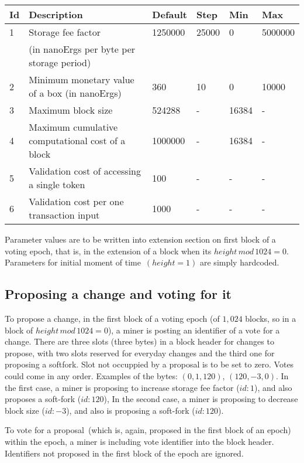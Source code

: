 \begin{tabular}{| l | l | l | l | l | l |}
\hline
Id & Description & Default & Step & Min & Max \\
\hline
\hline
1 & Storage fee factor  & 1250000 & 25000 & 0 & 5000000 \\
  &  (in nanoErgs per byte per storage period) & & & & \\
\hline
2 & Minimum monetary value of a box (in nanoErgs) & 360 & 10 & 0 & 10000 \\
\hline
3 & Maximum block size & 524288 & - & 16384 & - \\
\hline
4 & Maximum cumulative computational cost of a block & 1000000 & - & 16384 & - \\
\hline
5 & Validation cost of accessing a single token & 100 & - & - & - \\
\hline
6 & Validation cost per one transaction input & 1000 & - & - & - \\
\hline
\end{tabular}

Parameter values are to be written into extension section on first block of a voting epoch,
that is, in the extension of a block when its $height\,mod\,1024 = 0$.
Parameters for initial moment of time~$(height = 1)$ are simply hardcoded.

\subsection{Proposing a change and voting for it}

To propose a change, in the first block of a voting epoch (of $1,024$ blocks, so in a block of
$height\,mod\,1024 = 0$), a miner is posting an identifier of a vote for a change. There are three slots (three bytes)
in a block header for changes to propose, with two slots reserved for everyday changes and the third one for
proposing a softfork. Slot not occuppied by a proposal is to be set to zero. Votes could come in any order.
Examples of the bytes: $(0, 1, 120)$, $(120, -3, 0)$. In the first case, a miner is proposing to increase storage fee factor ($id:1$), and
also proposes a soft-fork ($id:120$), In the second case, a miner is proposing to decrease block size ($id:-3$), and also
 is proposing a soft-fork ($id:120$).

To vote for a proposal~(which is, again, proposed in the first block of an epoch) within the epoch, a miner is including vote identifier
into the block header. Identifiers not proposed in the first block of the epoch are ignored.

